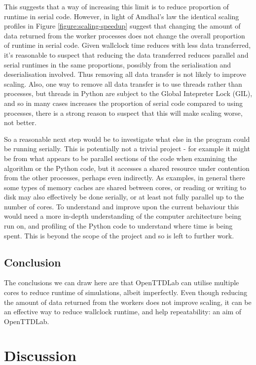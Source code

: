 \documentclass[logo,msc,dsti]{style/infthesis}    %
\begin{document}
{This suggests that a way of increasing this limit is to reduce proportion of runtime in serial code. However, in light of Amdhal's law the identical scaling profiles in Figure \ref{figure:scaling-speedup} suggest that changing the amount of data returned from the worker processes does not change the overall proportion of runtime in serial code. Given wallclock time reduces with less data transferred, it's reasonable to suspect that reducing the data transferred reduces parallel and serial runtimes in the same proportions, possibly from the serialisation and deserialisation involved. Thus removing all data transfer is not likely to improve scaling. Also, one way to remove all data transfer is to use threads rather than processes, but threads in Python are subject to the Global Intepreter Lock (GIL), and so in many cases increases the proportion of serial code compared to using processes, there is a strong reason to suspect that this will make scaling worse, not better.

So a reasonable next step would be to investigate what else in the program could be running serially. This is potentially not a trivial project - for example it might be from what appears to be parallel sections of the code when examining the algorithm or the Python code, but it accesses a shared resource under contention from the other processes, perhaps even indirectly. As examples, in general there some types of memory caches are shared between cores, or reading or writing to disk  may also effectively be done serially, or at least not fully parallel up to the number of cores. To understand and improve upon the current behaviour this would need a more in-depth understanding of the computer architecture being run on, and profiling of the Python code to understand where time is being spent. This is beyond the scope of the project and so is left to further work.

\section{Conclusion}

The conclusions we can draw here are that OpenTTDLab can utilise multiple cores to reduce runtime of simulations, albeit imperfectly. Even though reducing the amount of data returned from the workers does not improve scaling, it can be an effective way to reduce wallclock runtime, and help repeatability: an aim of OpenTTDLab.

\chapter{Discussion}
\label{chapter:discussion}

}
\end{document}
